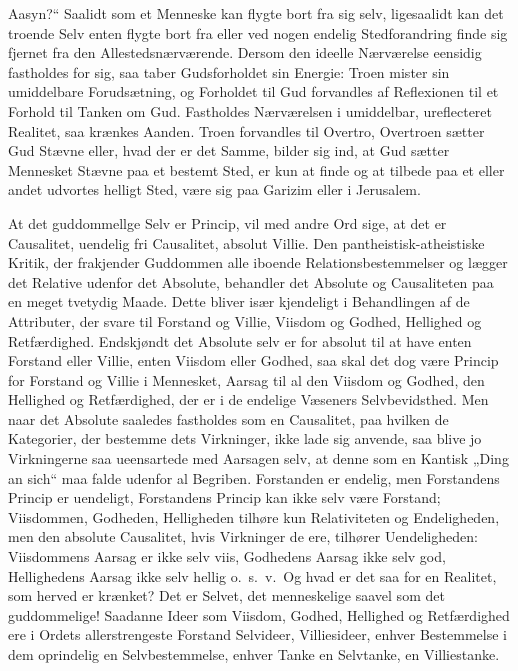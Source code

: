 \documentclass[12pt]{book}
\begin{document}
Aasyn?“ Saalidt som et Menneske kan flygte bort fra sig selv,
ligesaalidt kan det troende Selv enten flygte bort fra eller ved
nogen endelig Stedforandring finde sig fjernet fra den
Allestedsnærværende. Dersom den ideelle Nærværelse eensidig
fastholdes for sig, saa taber Gudsforholdet sin Energie: Troen
mister sin umiddelbare Forudsætning, og Forholdet til Gud forvandles
af Reflexionen til et Forhold til Tanken om Gud. Fastholdes
Nærværelsen i umiddelbar, ureflecteret Realitet, saa krænkes Aanden.
Troen forvandles til Overtro, Overtroen sætter Gud Stævne eller,
hvad der er det Samme, bilder sig ind, at Gud sætter Mennesket
Stævne paa et bestemt Sted, er kun at finde og at tilbede paa et
eller andet udvortes helligt Sted, være sig paa Garizim eller i
Jerusalem.

At det guddommellge Selv er Princip, vil med andre Ord sige, at det
er Causalitet, uendelig fri Causalitet, absolut Villie. Den
pantheistisk-atheistiske Kritik, der frakjender Guddommen alle
iboende Relationsbestemmelser og lægger det Relative udenfor det
Absolute, behandler det Absolute og Causaliteten paa en meget
tvetydig Maade. Dette bliver især kjendeligt i Behandlingen af de
Attributer, der svare til Forstand og Villie, Viisdom og Godhed,
Hellighed og Retfærdighed. Endskjøndt det Absolute selv er for
absolut til at have enten Forstand eller Villie, enten Viisdom eller
Godhed, saa skal det dog være Princip for Forstand og Villie i
Mennesket,
Aarsag til al den Viisdom og Godhed, den Hellighed og Retfærdighed,
der er i de endelige Væseners Selvbevidsthed. Men naar det Absolute
saaledes fastholdes som en Causalitet, paa hvilken de Kategorier,
der bestemme dets Virkninger, ikke lade sig anvende, saa blive jo
Virkningerne saa ueensartede med Aarsagen selv, at denne som en
Kantisk „Ding an sich“ maa falde udenfor al Begriben. Forstanden er
endelig, men Forstandens Princip er uendeligt, Forstandens Princip
kan ikke selv være Forstand; Viisdommen, Godheden, Helligheden
tilhøre kun Relativiteten og Endeligheden, men den absolute
Causalitet, hvis Virkninger de ere, tilhører Uendeligheden:
Viisdommens Aarsag er ikke selv viis, Godhedens Aarsag ikke selv
god, Hellighedens Aarsag ikke selv hellig o.\ s.\ v.\ Og hvad er
det saa for en Realitet, som herved er krænket? Det er Selvet, det
menneskelige saavel som det guddommelige! Saadanne Ideer som
Viisdom, Godhed, Hellighed og Retfærdighed ere i Ordets
allerstrengeste Forstand Selvideer, Villiesideer, enhver
Bestemmelse i dem oprindelig en Selvbestemmelse, enhver Tanke en
Selvtanke, en Villiestanke.
\end{document}
